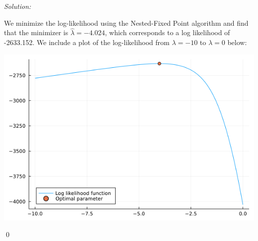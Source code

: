 \documentclass[12pt]{article}
\newenvironment{sol}
    {\emph{Solution:}
    }
    {
    \qed
    }
\begin{document}
\begin{sol}
   We minimize the log-likelihood using the Nested-Fixed Point algorithm and find that the minimizer is $\hat{\lambda} = -4.024$, which corresponds to a log likelihood of -2633.152. We include a plot of the log-likelihood from $\lambda = -10$ to $\lambda = 0$ below:
   \begin{center}
    \includegraphics[scale=0.5]{llopt.png}
   \end{center}
\end{sol}
\end{document}
